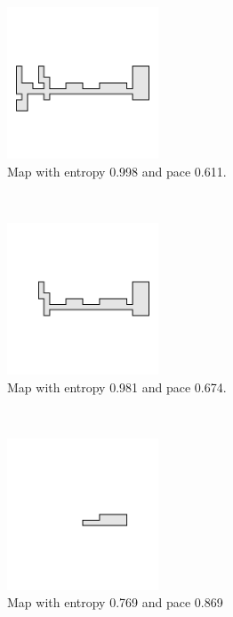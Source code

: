\begin{figure}[hbtp]
    \centering
    \begin{subfigure}[t]{0.3\textwidth}
        \centering
        \includegraphics[height=4.5cm]{Images/images/experiment_one/best_entropy_pop_0/map.png}
        \caption{Map with entropy 0.998 and pace 0.611.}
        \label{fig:best_entropy_map_0}
    \end{subfigure}%
    ~ 
    \begin{subfigure}[t]{0.3\textwidth}
        \centering
        \includegraphics[height=4.5cm]{Images/images/experiment_one/best_fitness_pop_0/map.png}
        \caption{Map with entropy 0.981 and pace 0.674.}    
        \label{fig:best_fitness_map_0}
    \end{subfigure}
    ~ 
    \begin{subfigure}[t]{0.3\textwidth}
        \centering
        \includegraphics[height=4.5cm]{Images/images/experiment_one/best_pace_pop_0/map.png}
        \caption{Map with entropy 0.769 and pace 0.869}
        \label{fig:best_pace_map_0}
    \end{subfigure}
    \centering
    \begin{subfigure}[t]{0.3\textwidth}

\end{subfigure}
\end{figure}
